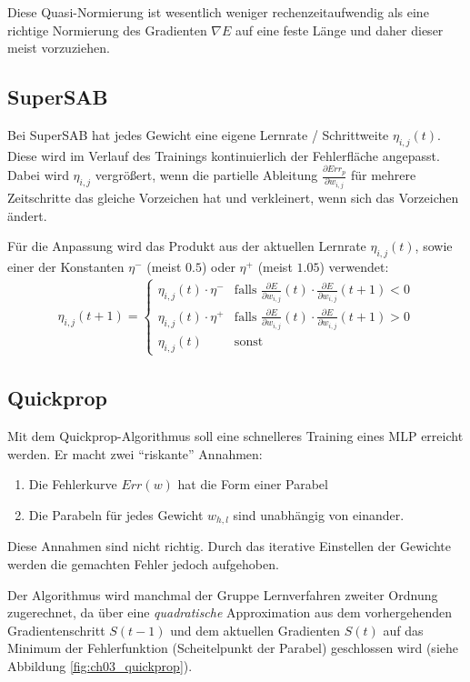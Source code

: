 Diese Quasi-Normierung ist wesentlich weniger rechenzeitaufwendig als eine richtige Normierung des Gradienten $\nabla E$ auf eine feste Länge und daher dieser meist vorzuziehen.


\subsection*{SuperSAB}
Bei SuperSAB hat jedes Gewicht eine eigene Lernrate / Schrittweite $\eta_{i,j}(t)$. Diese wird im Verlauf des Trainings kontinuierlich der Fehlerfläche angepasst. Dabei wird $\eta_{i,j}$ vergrößert, wenn die partielle Ableitung $\frac{\partial Err_p}{\partial w_{i,j}}$ für mehrere Zeitschritte das gleiche Vorzeichen hat und verkleinert, wenn sich das Vorzeichen ändert.

Für die Anpassung wird das Produkt aus der aktuellen Lernrate $\eta_{i,j}(t)$, sowie einer der Konstanten $\eta^-$ (meist $0.5$) oder $\eta^+$ (meist $1.05$) verwendet:
\begin{align*}
	\eta_{i,j}(t+1) = 
	\begin{cases}
		\eta_{i,j}(t) \cdot \eta^- &\text{falls }
			\frac{\partial E}{\partial w_{i,j}}(t) \cdot
			\frac{\partial E}{\partial w_{i,j}}(t+1) < 0 \\
		\eta_{i,j}(t) \cdot \eta^+ &\text{falls }
			\frac{\partial E}{\partial w_{i,j}}(t) \cdot
			\frac{\partial E}{\partial w_{i,j}}(t+1) > 0 \\
		\eta_{i,j}(t) &\text{sonst}
	\end{cases}
\end{align*}


\subsection*{Quickprop}
Mit dem Quickprop-Algorithmus soll eine schnelleres Training eines MLP erreicht werden. Er macht zwei "`riskante"' Annahmen:
\begin{enumerate}
	\item Die Fehlerkurve $Err(w)$ hat die Form einer Parabel
	\item Die Parabeln für jedes Gewicht $w_{h,l}$ sind unabhängig von einander.
\end{enumerate}
Diese Annahmen sind nicht richtig. Durch das iterative Einstellen der Gewichte werden die gemachten Fehler jedoch aufgehoben.

Der Algorithmus wird manchmal der Gruppe Lernverfahren zweiter Ordnung zugerechnet, da über eine \emph{quadratische} Approximation aus dem vorhergehenden Gradientenschritt $S(t-1)$ und dem aktuellen Gradienten $S(t)$ auf das Minimum der Fehlerfunktion (Scheitelpunkt der Parabel) geschlossen wird (siehe Abbildung \ref{fig:ch03_quickprop}).

